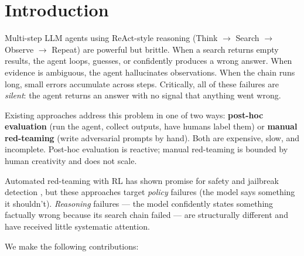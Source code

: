\documentclass[11pt,a4paper]{article}
\begin{document}
\newpage
\tableofcontents
\newpage

\section{Introduction}

Multi-step LLM agents using ReAct-style reasoning \cite{yao2023react}
(Think $\to$ Search $\to$ Observe $\to$ Repeat) are powerful but brittle.
When a search returns empty results, the agent loops, guesses, or confidently
produces a wrong answer. When evidence is ambiguous, the agent hallucinates
observations. When the chain runs long, small errors accumulate across steps.
Critically, all of these failures are \emph{silent}: the agent returns an answer
with no signal that anything went wrong.

Existing approaches address this problem in one of two ways:
\textbf{post-hoc evaluation} (run the agent, collect outputs, have humans label
them) or \textbf{manual red-teaming} (write adversarial prompts by hand).
Both are expensive, slow, and incomplete. Post-hoc evaluation is reactive;
manual red-teaming is bounded by human creativity and does not scale.

Automated red-teaming with RL has shown promise for safety and jailbreak
detection \cite{perez2022redteaming,zou2023universal}, but these approaches
target \emph{policy} failures (the model says something it shouldn't).
\emph{Reasoning} failures --- the model confidently states something factually
wrong because its search chain failed --- are structurally different and have
received little systematic attention.

We make the following contributions:
\end{document}
